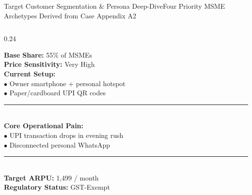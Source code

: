 \documentclass[aspectratio=169,10pt]{beamer}
\newcommand{\inr}{\text{Rs.\ }}
\begin{document}
\begin{frame}{Target Customer Segmentation \& Persona Deep-Dive}{Four Priority MSME Archetypes Derived from Case Appendix A2}
  \begin{columns}[T]
    \begin{column}{0.24\textwidth}
      \begin{tcolorbox}[academicbox, title={\fontsize{5.5pt}{6.6pt}\selectfont\textbf{1. Kirana \& Retail}}, coltitle=charcoal]
        {\fontsize{4.8pt}{5.8pt}\selectfont
        \textbf{Base Share:} 55\% of MSMEs \\
        \textbf{Price Sensitivity:} Very High \\
        \textbf{Current Setup:} \\
        $\bullet$ Owner smartphone + personal hotspot \\
        $\bullet$ Paper/cardboard UPI QR codes \\
        \textcolor{bordergray}{\rule{\linewidth}{0.25pt}} \\
        \textbf{Core Operational Pain:} \\
        $\bullet$ UPI transaction drops in evening rush \\
        $\bullet$ Disconnected personal WhatsApp \\
        \textcolor{bordergray}{\rule{\linewidth}{0.25pt}} \\
        \textbf{Target ARPU:} \inr 1,499 / month \\
        \textbf{Regulatory Status:} GST-Exempt
        }
      \end{tcolorbox}
    \end{column}


\end{columns}
\end{frame}
\end{document}
